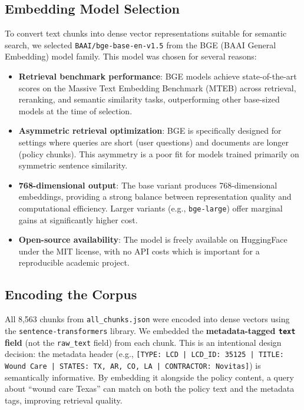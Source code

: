 \documentclass[12pt, letterpaper]{article}
\begin{document}
\subsection{Embedding Model Selection}

To convert text chunks into dense vector representations suitable for semantic search,
we selected \texttt{BAAI/bge-base-en-v1.5} from the BGE (BAAI General Embedding) model
family. This model was chosen for several reasons:

\begin{itemize}[noitemsep, topsep=4pt]
    \item \textbf{Retrieval benchmark performance}: BGE models achieve state-of-the-art
          scores on the Massive Text Embedding Benchmark (MTEB) across retrieval,
          reranking, and semantic similarity tasks, outperforming other base-sized models
          at the time of selection.
    \item \textbf{Asymmetric retrieval optimization}: BGE is specifically designed for
          settings where queries are short (user questions) and documents are longer
          (policy chunks). This asymmetry is a poor fit for models trained primarily 
          on symmetric sentence similarity.
    \item \textbf{768-dimensional output}: The base variant produces 768-dimensional
          embeddings, providing a strong balance between representation quality and
          computational efficiency. Larger variants (e.g., \texttt{bge-large}) offer
          marginal gains at significantly higher cost.
    \item \textbf{Open-source availability}: The model is freely available on HuggingFace
          under the MIT license, with no API costs which is important for a reproducible
          academic project.
\end{itemize}

\subsection{Encoding the Corpus}

All 8,563 chunks from \texttt{all\_chunks.json} were encoded into dense vectors using
the \texttt{sentence-transformers} library. We embedded the \textbf{metadata-tagged
\texttt{text} field} (not the \texttt{raw\_text} field) from each chunk. This is an
intentional design decision: the metadata header (e.g.,
\texttt{[TYPE: LCD | LCD\_ID: 35125 | TITLE: Wound Care | STATES: TX, AR, CO, LA |
CONTRACTOR: Novitas]}) is semantically informative. By embedding it alongside the
policy content, a query about ``wound care Texas'' can match on both the policy text
and the metadata tags, improving retrieval quality.
\end{document}
